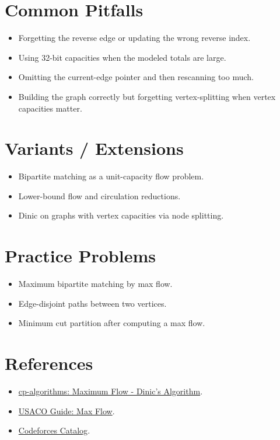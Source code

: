 \section*{Common Pitfalls}

\begin{itemize}
  \item Forgetting the reverse edge or updating the wrong reverse index.
  \item Using 32-bit capacities when the modeled totals are large.
  \item Omitting the current-edge pointer and then rescanning too much.
  \item Building the graph correctly but forgetting vertex-splitting when vertex capacities matter.
\end{itemize}

\section*{Variants / Extensions}

\begin{itemize}
  \item Bipartite matching as a unit-capacity flow problem.
  \item Lower-bound flow and circulation reductions.
  \item Dinic on graphs with vertex capacities via node splitting.
\end{itemize}

\section*{Practice Problems}

\begin{itemize}
  \item Maximum bipartite matching by max flow.
  \item Edge-disjoint paths between two vertices.
  \item Minimum cut partition after computing a max flow.
\end{itemize}

\section*{References}

\begin{itemize}
  \item \href{https://cp-algorithms.com/graph/dinic.html}{cp-algorithms: Maximum Flow - Dinic's Algorithm}.
  \item \href{https://usaco.guide/adv/max-flow}{USACO Guide: Max Flow}.
  \item \href{https://codeforces.com/catalog}{Codeforces Catalog}.
\end{itemize}
